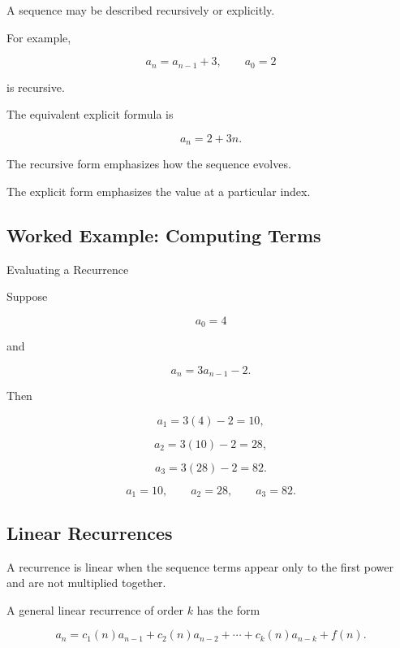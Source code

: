 A sequence may be described recursively or explicitly.

For example,

\[
a_n=a_{n-1}+3,
\qquad
a_0=2
\]

is recursive.

The equivalent explicit formula is

\[
\boxed{
a_n=2+3n.
}
\]

The recursive form emphasizes how the sequence evolves.

The explicit form emphasizes the value at a particular index.

\subsection{Worked Example: Computing Terms}
\label{subsec:worked-computing-recurrence}

\begin{workedexamplebox}{Evaluating a Recurrence}

Suppose

\[
a_0=4
\]

and

\[
a_n=3a_{n-1}-2.
\]

Then

\[
a_1=3(4)-2=10,
\]

\[
a_2=3(10)-2=28,
\]

\[
a_3=3(28)-2=82.
\]

\begin{answerbox}
\[
\boxed{
a_1=10,\qquad
a_2=28,\qquad
a_3=82.
}
\]
\end{answerbox}

\end{workedexamplebox}

\subsection{Linear Recurrences}
\label{subsec:linear-recurrences}

A recurrence is linear when the sequence terms appear only to the first
power and are not multiplied together.

A general linear recurrence of order \(k\) has the form

\[
\boxed{
a_n
=
c_1(n)a_{n-1}
+
c_2(n)a_{n-2}
+\cdots+
c_k(n)a_{n-k}
+
f(n).
}
\]

